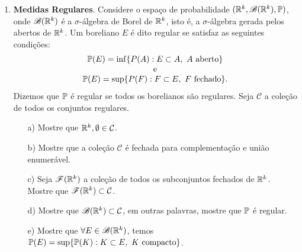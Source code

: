 \begin{enumerate}[leftmargin=*]
\item 
{\bf Medidas Regulares}. 
Considere o espaço de probabilidade
$(\R^k,\mathscr{B}(\R^k),\P)$, onde 
$\mathscr{B}(\R^k)$ é a $\sigma$-álgebra de Borel 
de $\R^k$, isto é, a $\sigma$-álgebra gerada pelos 
abertos de $\R^k$.
Um boreliano $E$ é dito regular se satisfaz as seguintes
condições:
\[
\begin{array}{c}
\P(E) = \inf\{P(A): E\subset A,\ A\ \text{aberto} \}
\\
\text{e}
\\
\P(E) = \sup\{P(F): F\subset E,\ F\ \text{fechado} \}.
\end{array}
\]
Dizemos que $\P$ é regular se todos os borelianos são 
regulares. Seja $\mathcal{C}$ a coleção de todos os
conjuntos regulares.
	\begin{itemize}
	\item[a)]
	Mostre que $\R^k,\emptyset\in \mathcal{C}$.
	
	\item[b)]
	Mostre que a coleção $\mathcal{C}$ é fechada 
	para complementação e união enumerável.
	
	\item[c)]
	Seja $\mathscr{F}(\R^k)$ a coleção de todos os 
	subconjuntos fechados de $\R^k$. Mostre que 
	$\mathscr{F}(\R^k)\subset \mathcal{C}$.
	
	\item[d)]
	Mostre que $\mathscr{B}(\R^k)\subset \mathcal{C}$, em outras palavras,
	mostre que $\P$ é regular.
	
	\item[e)] 
	Mostre que $\forall E\in\mathscr{B}(\R^k)$, temos
	$\P(E) = \sup\{ \P(K): K\subset E,\ K\ \text{compacto}\}$.
	\end{itemize}


































\end{enumerate}



